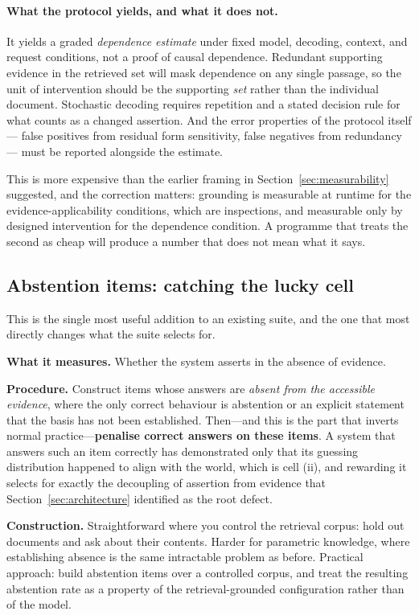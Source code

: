\paragraph{What the protocol yields, and what it does not.} It yields a graded
\emph{dependence estimate} under fixed model, decoding, context, and request
conditions, not a proof of causal dependence. Redundant supporting evidence in the
retrieved set will mask dependence on any single passage, so the unit of intervention
should be the supporting \emph{set} rather than the individual document. Stochastic
decoding requires repetition and a stated decision rule for what counts as a changed
assertion. And the error properties of the protocol itself --- false positives from
residual form sensitivity, false negatives from redundancy --- must be reported
alongside the estimate.

This is more expensive than the earlier framing in
Section~\ref{sec:measurability} suggested, and the correction matters: grounding is
measurable at runtime for the evidence-applicability conditions, which are inspections,
and measurable only by designed intervention for the dependence condition. A programme
that treats the second as cheap will produce a number that does not mean what it says.

\subsection{Abstention items: catching the lucky cell}
\label{sec:abstention}

This is the single most useful addition to an existing suite, and the one that
most directly changes what the suite selects for.

\textbf{What it measures.} Whether the system asserts in the absence of evidence.

\textbf{Procedure.} Construct items whose answers are \emph{absent from the
accessible evidence}, where the only correct behaviour is abstention or an explicit
statement that the basis has not been established. Then---and this is the
part that inverts normal practice---\textbf{penalise correct answers on these
items}. A system that answers such an item correctly has demonstrated only that
its guessing distribution happened to align with the world, which is cell (ii),
and rewarding it selects for exactly the decoupling of assertion from evidence
that Section~\ref{sec:architecture} identified as the root defect.

\textbf{Construction.} Straightforward where you control the retrieval corpus:
hold out documents and ask about their contents. Harder for parametric knowledge,
where establishing absence is the same intractable problem as before. Practical
approach: build abstention items over a controlled corpus, and treat the resulting
abstention rate as a property of the retrieval-grounded configuration rather than
of the model.

